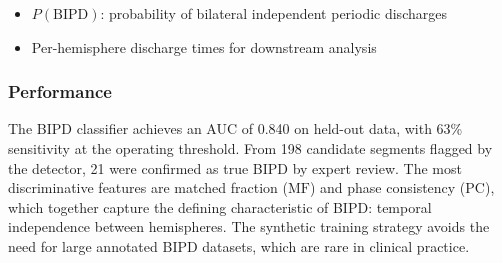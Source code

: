 \begin{itemize}
  \item $P(\text{BIPD})$: probability of bilateral independent periodic discharges
  \item Per-hemisphere discharge times for downstream analysis
\end{itemize}

\subsubsection{Performance}

The BIPD classifier achieves an AUC of 0.840 on held-out data, with 63\% sensitivity at the operating threshold. From 198 candidate segments flagged by the detector, 21 were confirmed as true BIPD by expert review. The most discriminative features are matched fraction ($\mathrm{MF}$) and phase consistency ($\mathrm{PC}$), which together capture the defining characteristic of BIPD: temporal independence between hemispheres. The synthetic training strategy avoids the need for large annotated BIPD datasets, which are rare in clinical practice.
